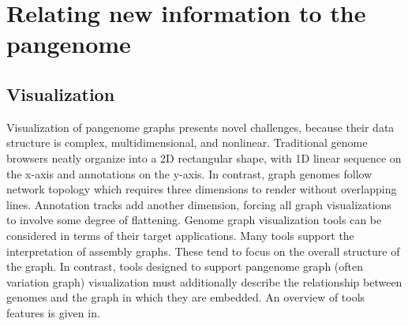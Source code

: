 \section{Relating new information to the pangenome}

\subsection{Visualization}


Visualization of pangenome graphs presents novel challenges, because their data structure is complex, multidimensional, and nonlinear.
Traditional genome browsers neatly organize into a 2D rectangular shape, with 1D linear sequence on the x-axis and annotations on the y-axis.
In contrast, graph genomes follow network topology which requires three dimensions to render without overlapping lines.
Annotation tracks add another dimension, forcing all graph visualizations to involve some degree of flattening.  
Genome graph visualization tools can be considered in terms of their target applications. 
Many tools support the interpretation of assembly graphs. 
These tend to focus on the overall structure of the graph. 
In contrast, tools designed to support pangenome graph (often variation graph) visualization must additionally describe the relationship between genomes and the graph in which they are embedded.
An overview of tools features is given in.


